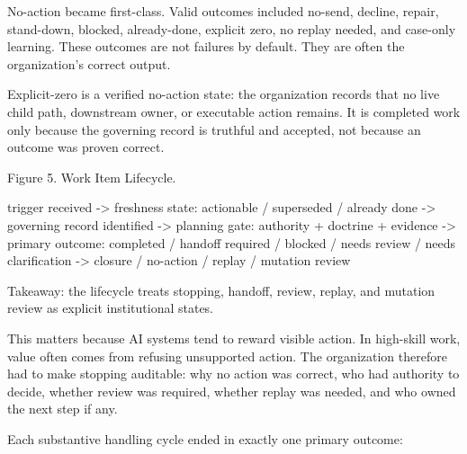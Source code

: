 \documentclass[
]{article}
\newenvironment{Shaded}{}{}
\newcommand{\NormalTok}[1]{#1}
\begin{document}
No-action became first-class. Valid outcomes included no-send, decline, repair, stand-down, blocked, already-done, explicit zero, no replay needed, and case-only learning. These outcomes are not failures by default. They are often the organization's correct output.

Explicit-zero is a verified no-action state: the organization records that no live child path, downstream owner, or executable action remains. It is completed work only because the governing record is truthful and accepted, not because an outcome was proven correct.

Figure 5. Work Item Lifecycle.

\begin{Shaded}
\begin{Highlighting}[]
\NormalTok{trigger received}
\NormalTok{  {-}\textgreater{} freshness state: actionable / superseded / already done}
\NormalTok{  {-}\textgreater{} governing record identified}
\NormalTok{  {-}\textgreater{} planning gate: authority + doctrine + evidence}
\NormalTok{  {-}\textgreater{} primary outcome:}
\NormalTok{       completed / handoff required / blocked / needs review / needs clarification}
\NormalTok{  {-}\textgreater{} closure / no{-}action / replay / mutation review}
\end{Highlighting}
\end{Shaded}

Takeaway: the lifecycle treats stopping, handoff, review, replay, and mutation review as explicit institutional states.

This matters because AI systems tend to reward visible action. In high-skill work, value often comes from refusing unsupported action. The organization therefore had to make stopping auditable: why no action was correct, who had authority to decide, whether review was required, whether replay was needed, and who owned the next step if any.

Each substantive handling cycle ended in exactly one primary outcome:
\end{document}
